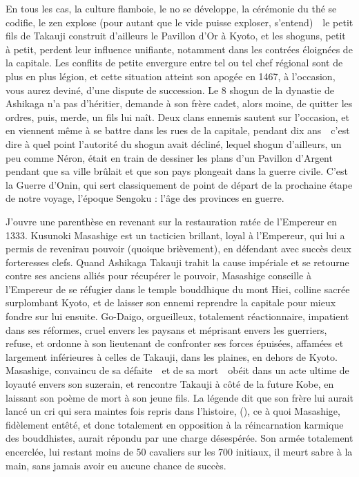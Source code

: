 En tous les cas, la culture flamboie, le no se développe, la cérémonie du thé
se codifie, le zen explose (pour autant que le vide puisse exploser,
s'entend)~\incise~le petit fils de Takauji construit d'ailleurs le Pavillon
d'Or à Kyoto, et les shoguns, petit à petit, perdent leur influence unifiante,
notamment dans les contrées éloignées de la capitale. Les conflits de petite
envergure entre tel ou tel chef régional sont de plus en plus légion, et cette
situation atteint son apogée en 1467, à l'occasion, vous aurez deviné, d'une
dispute de succession. Le 8 shogun de la dynastie de Ashikaga n'a pas
d'héritier, demande à son frère cadet, alors moine, de quitter les ordres,
puis, merde, un fils lui naît. Deux clans ennemis sautent sur l'occasion, et en
viennent même à se battre dans les rues de la capitale, pendant dix
ans~\incise~c'est dire à quel point l'autorité du shogun avait décliné, lequel
shogun d'ailleurs, un peu comme Néron, était en train de dessiner les plans
d'un Pavillon d'Argent pendant que sa ville brûlait et que son pays plongeait
dans la guerre civile. C'est la Guerre d'Onin, qui sert classiquement de point
de départ de la prochaine étape de notre voyage, l'époque Sengoku : l'âge des
provinces en guerre.

J'ouvre une parenthèse en revenant sur la restauration ratée de l'Empereur en
1333. Kusunoki Masashige est un tacticien brillant, loyal à l'Empereur, qui lui
a permis de revenirau pouvoir (quoique brièvement), en défendant avec succès
deux forteresses clefs. Quand Ashikaga Takauji trahit la cause impériale et se
retourne contre ses anciens alliés pour récupérer le pouvoir, Masashige
conseille à l'Empereur de se réfugier dans le temple bouddhique du mont Hiei,
colline sacrée surplombant Kyoto, et de laisser son ennemi reprendre la
capitale pour mieux fondre sur lui ensuite. Go-Daigo, orgueilleux, totalement
réactionnaire, impatient dans ses réformes, cruel envers les paysans et
méprisant envers les guerriers, refuse, et ordonne à son lieutenant de
confronter ses forces épuisées, affamées et largement inférieures à celles de
Takauji, dans les plaines, en dehors de Kyoto. Masashige, convaincu de sa
défaite~\incise~et de sa mort~\incise~obéit dans un acte ultime de loyauté
envers son suzerain, et rencontre Takauji à côté de la future Kobe, en laissant
son poème de mort à son jeune fils. La légende dit que son frère lui aurait
lancé un cri qui sera maintes fois repris dans l'histoire,  (), ce à quoi
Masashige, fidèlement entêté, et donc totalement en opposition à la
réincarnation karmique des bouddhistes, aurait répondu par une charge
désespérée. Son armée totalement encerclée, lui restant moins de 50 cavaliers
sur les 700 initiaux, il meurt sabre à la main, sans jamais avoir eu aucune
chance de succès.

